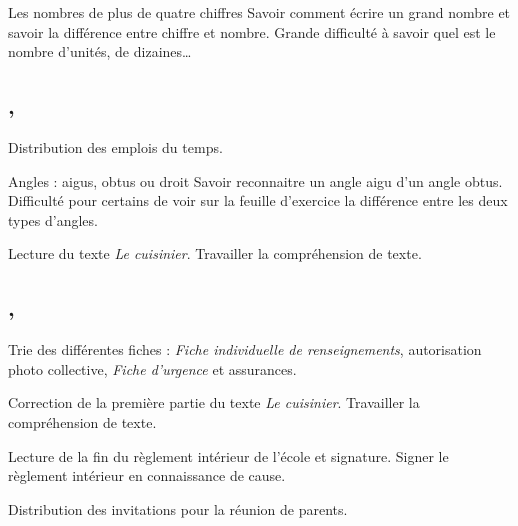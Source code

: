 \documentclass{article}
\begin{document}
\nec\hpm Les nombres de plus de quatre chiffres
\obj Savoir comment écrire un grand nombre et savoir la différence entre chiffre et nombre.
\bil Grande difficulté à savoir quel est le nombre d’unités, de dizaines\dots


\subsection{ \sep}
\gdc Distribution des emplois du temps.

\eeg\ham Angles : aigus, obtus ou droit
\obj Savoir reconnaitre un angle aigu d’un angle obtus.
\bil Difficulté pour certains de voir sur la feuille d’exercice la différence entre les deux types d’angles.

\lec\hpm Lecture du texte \emph{Le cuisinier}.
\obj Travailler la compréhension de texte.


\subsection{ \sep}
\adm\ham Trie  des différentes fiches : \textit{Fiche individuelle de renseignements}, autorisation photo collective, \textit{Fiche d’urgence} et assurances.

\lec\amr Correction de la première partie du texte \emph{Le cuisinier}.
\obj Travailler la compréhension de texte.

\emc\hpm Lecture de la fin du règlement intérieur de l’école et signature.
\obj Signer le règlement intérieur en connaissance de cause.

\adm{} Distribution des invitations pour la réunion de parents.


\setlength{\parskip}{0ex}
\tableofcontents
{}
\end{document}
